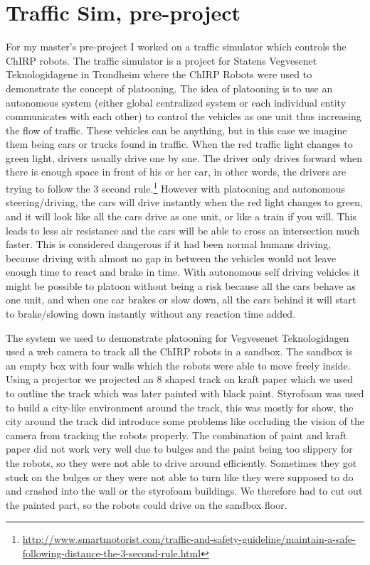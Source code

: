 \section{Traffic Sim, pre-project}
\label{sec:prepro}
For my master's pre-project I worked on a traffic simulator which controls the ChIRP robots.
The traffic simulator is a project for Statens Vegvesenet Teknologidagene in Trondheim where the ChIRP Robots were used to demonstrate the concept of platooning. 
The idea of platooning is to use an autonomous system (either global centralized system or each individual entity communicates with each other) to control the vehicles as one unit thus increasing the flow of traffic. These vehicles can be anything, but in this case we imagine them being cars or trucks found in traffic. When the red traffic light changes to green light, drivers usually drive one by one. The driver only drives forward when there is enough space in front of his or her car, in other words, the drivers are trying to follow the 3 second rule.\footnote{\href{http://www.smartmotorist.com/traffic-and-safety-guideline/maintain-a-safe-following-distance-the-3-second-rule.html}{http://www.smartmotorist.com/traffic-and-safety-guideline/maintain-a-safe-following-distance-the-3-second-rule.html}}
However with platooning and autonomous steering/driving, the cars will drive instantly when the red light changes to green, and it will look like all the cars drive as one unit, or like a train if you will.
This leads to less air resistance and the cars will be able to cross an intersection much faster. This is considered dangerous if it had been normal humans driving, because driving with almost no gap in between the vehicles would not leave enough time to react and brake in time. With autonomous self driving vehicles it might be possible to platoon without being a risk because all the cars behave as one unit, and when one car brakes or slow down, all the cars behind it will start to brake/slowing down instantly without any reaction time added.

The system we used to demonstrate platooning for Vegvesenet Teknologidagen used a web camera to track all the ChIRP robots in a sandbox. The sandbox is an empty box with four walls which the robots were able to move freely inside. Using a projector we projected an 8 shaped track on kraft paper which we used to outline the track which was later painted with black paint. Styrofoam was used to build a city-like environment around the track, this was mostly for show, the city around the track did introduce some problems like occluding the vision of the camera from tracking the robots properly.
The combination of paint and kraft paper did not work very well due to bulges and the paint being too slippery for the robots, so they were not able to drive around efficiently. Sometimes they got stuck on the bulges or they were not able to turn like they were supposed to do and crashed into the wall or the styrofoam buildings.  We therefore had to cut out the painted part, so the robots could drive on the sandbox floor.


